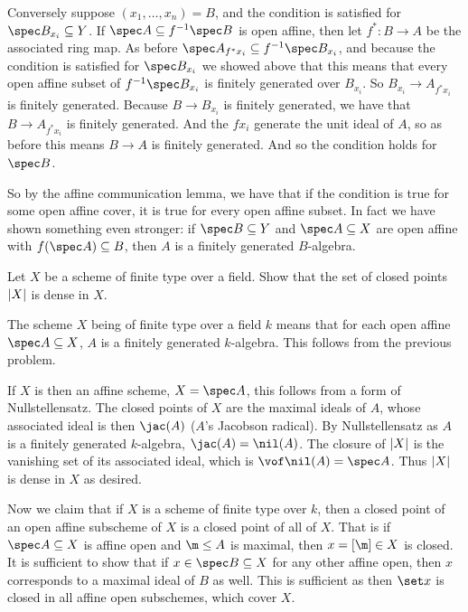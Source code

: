 Conversely suppose $(x_1,\dots,x_n)=B$, and the condition is satisfied for $\spec B_{x_i}\subseteq Y$.
If $\spec A\subseteq f^{-1}\spec B$ is open affine, then let $f^*\colon B\to A$ be the associated ring map.
As before $\spec A_{f^*x_i}\subseteq f^{-1}\spec B_{x_i}$, and because the condition is satisfied for $\spec B_{x_i}$
we showed above that this means that every open affine subset of $f^{-1}\spec B_{x_i}$ is finitely generated over $B_{x_i}$.
So $B_{x_i}\to A_{f^*x_i}$ is finitely generated.
Because $B\to B_{x_i}$ is finitely generated, we have that $B\to A_{f^*x_i}$ is finitely generated.
And the $fx_i$ generate the unit ideal of $A$, so as before this means $B\to A$ is finitely generated.
And so the condition holds for $\spec B$.

So by the affine communication lemma, we have that if the condition is true for some open affine cover, it is true for every open affine subset.
In fact we have shown something even stronger: if $\spec B\subseteq Y$ and $\spec A\subseteq X$ are open affine with $f(\spec A)\subseteq B$,
then $A$ is a finitely generated $B$-algebra.

\bprob[title={Hartshorne II.3.14}]

    Let $X$ be a scheme of finite type over a field.
    Show that the set of closed points $\mathopen{}\mathclose{\left|X\right|}$ is dense in $X$.

\eprob

The scheme $X$ being of finite type over a field $k$ means that for each open affine $\spec A\subseteq X$, $A$ is a finitely generated $k$-algebra.
This follows from the previous problem.

If $X$ is then an affine scheme, $X=\spec A$, this follows from a form of Nullstellensatz.
The closed points of $X$ are the maximal ideals of $A$, whose associated ideal is then $\jac(A)$ ($A$'s Jacobson radical).
By Nullstellensatz as $A$ is a finitely generated $k$-algebra, $\jac(A)=\nil(A)$.
The closure of $\mathopen{}\mathclose{\left|X\right|}$ is the vanishing set of its associated ideal, which is $\vof\nil(A)=\spec A$.
Thus $\mathopen{}\mathclose{\left|X\right|}$ is dense in $X$ as desired.

Now we claim that if $X$ is a scheme of finite type over $k$, then a closed point of an open affine subscheme of $X$ is a closed point of all of $X$.
That is if $\spec A\subseteq X$ is affine open and $\m\leq A$ is maximal, then $x=[\m]\in X$ is closed.
It is sufficient to show that if $x\in\spec B\subseteq X$ for any other affine open, then $x$ corresponds to a maximal ideal of $B$ as well.
This is sufficient as then $\set x$ is closed in all affine open subschemes, which cover $X$.

